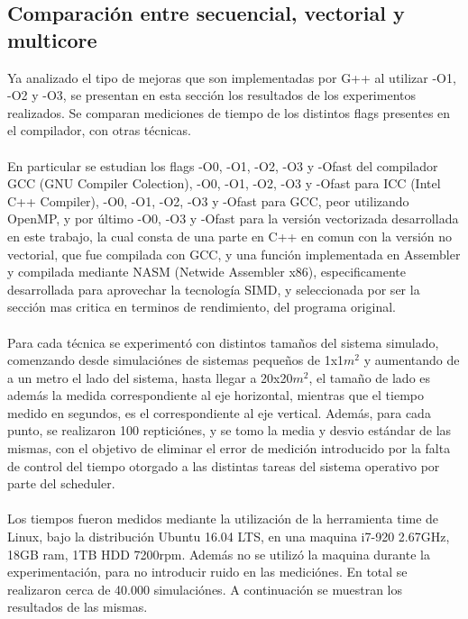 \subsection{Comparación entre secuencial, vectorial y multicore}
Ya analizado el tipo de mejoras que son implementadas por G++ al utilizar -O1, -O2 y -O3, se presentan en esta sección los resultados de los experimentos realizados. Se comparan mediciones de tiempo de los distintos flags presentes en el compilador, con otras técnicas. 
~\\
~\\
En particular se estudian los flags -O0, -O1, -O2, -O3 y -Ofast del compilador GCC (GNU Compiler Colection), -O0, -O1, -O2, -O3 y -Ofast para ICC (Intel C++ Compiler), -O0, -O1, -O2, -O3 y -Ofast para GCC, peor utilizando OpenMP, y por último -O0, -O3 y -Ofast para la versión vectorizada desarrollada en este trabajo, la cual consta de una parte en C++ en comun con la versión no vectorial, que fue compilada con GCC, y una función implementada en Assembler y compilada mediante NASM (Netwide Assembler x86), especificamente desarrollada para aprovechar la tecnología SIMD, y seleccionada por ser la sección mas critica en terminos de rendimiento, del programa original.
~\\
~\\
Para cada técnica se experimentó con distintos tamaños del sistema simulado, comenzando desde simulaciónes de sistemas pequeños de 1x1$m^2$ y aumentando de a un metro el lado del sistema, hasta llegar a 20x20$m^2$, el tamaño de lado es además la medida correspondiente al eje horizontal, mientras que el tiempo medido en segundos, es el correspondiente al eje vertical. Además, para cada punto, se realizaron 100 repticiónes, y se tomo la media y desvio estándar de las mismas, con el objetivo de eliminar el error de medición introducido por la falta de control del tiempo otorgado a las distintas tareas del sistema operativo por parte del scheduler. 
~\\
~\\
Los tiempos fueron medidos mediante la utilización de la herramienta time de Linux, bajo la distribución Ubuntu 16.04 LTS, en una maquina i7-920 2.67GHz, 18GB ram, 1TB HDD 7200rpm. Además no se utilizó la maquina durante la experimentación, para no introducir ruido en las mediciónes. En total se realizaron cerca de 40.000 simulaciónes. A continuación se muestran los resultados de las mismas.
~\\
~\\

